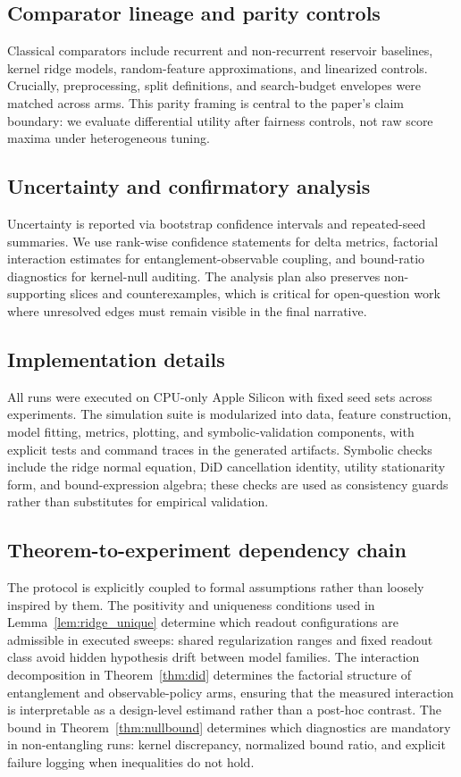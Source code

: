 \documentclass{article} %
\begin{document}
\subsection{Comparator lineage and parity controls}
Classical comparators include recurrent and non-recurrent reservoir baselines, kernel ridge models, random-feature approximations, and linearized controls. Crucially, preprocessing, split definitions, and search-budget envelopes were matched across arms. This parity framing is central to the paper's claim boundary: we evaluate differential utility after fairness controls, not raw score maxima under heterogeneous tuning.

\subsection{Uncertainty and confirmatory analysis}
Uncertainty is reported via bootstrap confidence intervals and repeated-seed summaries. We use rank-wise confidence statements for delta metrics, factorial interaction estimates for entanglement-observable coupling, and bound-ratio diagnostics for kernel-null auditing. The analysis plan also preserves non-supporting slices and counterexamples, which is critical for open-question work where unresolved edges must remain visible in the final narrative.

\subsection{Implementation details}
All runs were executed on CPU-only Apple Silicon with fixed seed sets across experiments. The simulation suite is modularized into data, feature construction, model fitting, metrics, plotting, and symbolic-validation components, with explicit tests and command traces in the generated artifacts. Symbolic checks include the ridge normal equation, DiD cancellation identity, utility stationarity form, and bound-expression algebra; these checks are used as consistency guards rather than substitutes for empirical validation.

\subsection{Theorem-to-experiment dependency chain}
The protocol is explicitly coupled to formal assumptions rather than loosely inspired by them. The positivity and uniqueness conditions used in Lemma~\ref{lem:ridge_unique} determine which readout configurations are admissible in executed sweeps: shared regularization ranges and fixed readout class avoid hidden hypothesis drift between model families. The interaction decomposition in Theorem~\ref{thm:did} determines the factorial structure of entanglement and observable-policy arms, ensuring that the measured interaction is interpretable as a design-level estimand rather than a post-hoc contrast. The bound in Theorem~\ref{thm:nullbound} determines which diagnostics are mandatory in non-entangling runs: kernel discrepancy, normalized bound ratio, and explicit failure logging when inequalities do not hold.
\end{document}
